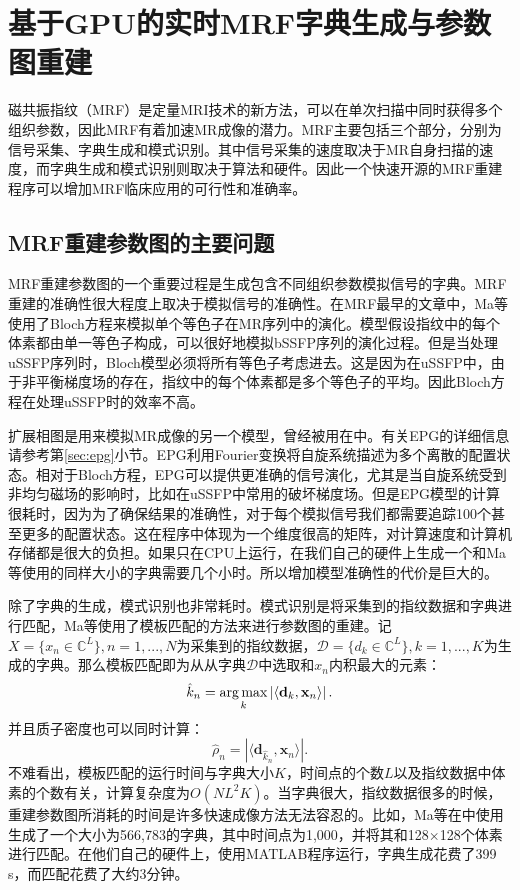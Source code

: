 \chapter{基于GPU的实时MRF字典生成与参数图重建}
\label{chap:snapMRF}
磁共振指纹（MRF）是定量MRI技术的新方法，可以在单次扫描中同时获得多个组织参数\cite{mrf,esr,bipin_mehta_magnetic_2019}，因此MRF有着加速MR成像的潜力。MRF主要包括三个部分，分别为信号采集、字典生成和模式识别。其中信号采集的速度取决于MR自身扫描的速度，而字典生成和模式识别则取决于算法和硬件。因此一个快速开源的MRF重建程序可以增加MRF临床应用的可行性和准确率。

\section{MRF重建参数图的主要问题}
MRF重建参数图的一个重要过程是生成包含不同组织参数模拟信号的字典。MRF重建的准确性很大程度上取决于模拟信号的准确性。在MRF最早的文章中，Ma等\cite{mrf}使用了Bloch方程来模拟单个等色子在MR序列中的演化。模型假设指纹中的每个体素都由单一等色子构成，可以很好地模拟bSSFP序列的演化过程。但是当处理uSSFP序列时，Bloch模型必须将所有等色子考虑进去。这是因为在uSSFP中，由于非平衡梯度场的存在，指纹中的每个体素都是多个等色子的平均。因此Bloch方程在处理uSSFP时的效率不高。

扩展相图是用来模拟MR成像的另一个模型，曾经被用在\cite{jiang}中。有关EPG的详细信息请参考第\ref{sec:epg}小节。EPG利用Fourier变换将自旋系统描述为多个离散的配置状态。相对于Bloch方程，EPG可以提供更准确的信号演化，尤其是当自旋系统受到非均匀磁场的影响时，比如在uSSFP中常用的破坏梯度场。但是EPG模型的计算很耗时，因为为了确保结果的准确性，对于每个模拟信号我们都需要追踪100个甚至更多的配置状态。这在程序中体现为一个维度很高的矩阵，对计算速度和计算机存储都是很大的负担。如果只在CPU上运行，在我们自己的硬件上生成一个和Ma等\cite{mrf}使用的同样大小的字典需要几个小时。所以增加模型准确性的代价是巨大的。

除了字典的生成，模式识别也非常耗时。模式识别是将采集到的指纹数据和字典进行匹配，Ma等\cite{mrf}使用了模板匹配的方法来进行参数图的重建。记$X=\{x_n\in \mathbb{C}^L\}, n=1,...,N$为采集到的指纹数据，$\mathcal{D}=\{d_k\in \mathbb{C}^L\},k=1,...,K$为生成的字典。那么模板匹配即为从从字典$\mathcal{D}$中选取和$x_n$内积最大的元素：
	\begin{equation}
	\hat{k}_n = \operatorname*{arg\,max}_k \left|\left\langle \mathbf{d}_k,\mathbf{x}_n \right\rangle \right|.
	\end{equation}
并且质子密度也可以同时计算：
	\begin{equation}
	\hat{\rho}_n=\left|\langle \mathbf{d}_{\hat{k}_n},\mathbf{x}_n \rangle\right|.
	\end{equation}
不难看出，模板匹配的运行时间与字典大小$K$，时间点的个数$L$以及指纹数据中体素的个数有关，计算复杂度为$O(NL^2K)$。当字典很大，指纹数据很多的时候，重建参数图所消耗的时间是许多快速成像方法无法容忍的。比如，Ma等在\cite{mrf}中使用生成了一个大小为566,783的字典，其中时间点为1,000，并将其和128$\times$128个体素进行匹配。在他们自己的硬件上，使用MATLAB程序运行，字典生成花费了399 s，而匹配花费了大约3分钟。

